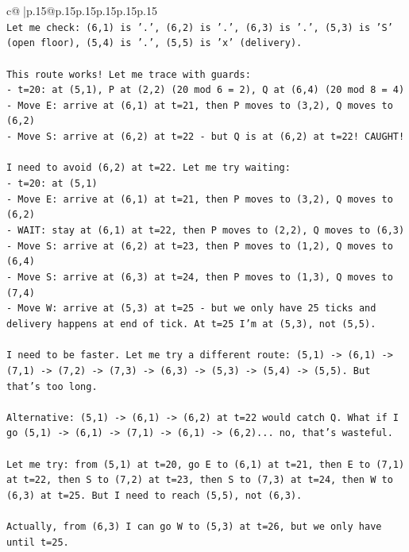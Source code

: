\documentclass{article}
\begin{document}
{\begin{supertabular}{c@{$\;$}|p{.15\linewidth}@{}p{.15\linewidth}p{.15\linewidth}p{.15\linewidth}p{.15\linewidth}p{.15\linewidth}}
{{{\\ 
\texttt{Let me check: (6,1) is '.', (6,2) is '.', (6,3) is '.', (5,3) is 'S' (open floor), (5,4) is '.', (5,5) is 'x' (delivery).} \\
\\ 
\texttt{This route works! Let me trace with guards:} \\
\texttt{{-} t=20: at (5,1), P at (2,2) (20 mod 6 = 2), Q at (6,4) (20 mod 8 = 4)} \\
\texttt{{-} Move E: arrive at (6,1) at t=21, then P moves to (3,2), Q moves to (6,2)} \\
\texttt{{-} Move S: arrive at (6,2) at t=22 {-} but Q is at (6,2) at t=22! CAUGHT!} \\
\\ 
\texttt{I need to avoid (6,2) at t=22. Let me try waiting:} \\
\texttt{{-} t=20: at (5,1)} \\
\texttt{{-} Move E: arrive at (6,1) at t=21, then P moves to (3,2), Q moves to (6,2)} \\
\texttt{{-} WAIT: stay at (6,1) at t=22, then P moves to (2,2), Q moves to (6,3)} \\
\texttt{{-} Move S: arrive at (6,2) at t=23, then P moves to (1,2), Q moves to (6,4)} \\
\texttt{{-} Move S: arrive at (6,3) at t=24, then P moves to (1,3), Q moves to (7,4)} \\
\texttt{{-} Move W: arrive at (5,3) at t=25 {-} but we only have 25 ticks and delivery happens at end of tick. At t=25 I'm at (5,3), not (5,5).} \\
\\ 
\texttt{I need to be faster. Let me try a different route: (5,1) {-}> (6,1) {-}> (7,1) {-}> (7,2) {-}> (7,3) {-}> (6,3) {-}> (5,3) {-}> (5,4) {-}> (5,5). But that's too long.} \\
\\ 
\texttt{Alternative: (5,1) {-}> (6,1) {-}> (6,2) at t=22 would catch Q. What if I go (5,1) {-}> (6,1) {-}> (7,1) {-}> (6,1) {-}> (6,2)... no, that's wasteful.} \\
\\ 
\texttt{Let me try: from (5,1) at t=20, go E to (6,1) at t=21, then E to (7,1) at t=22, then S to (7,2) at t=23, then S to (7,3) at t=24, then W to (6,3) at t=25. But I need to reach (5,5), not (6,3).} \\
\\ 
\texttt{Actually, from (6,3) I can go W to (5,3) at t=26, but we only have until t=25.} \\
}}}
\end{supertabular}}
\end{document}
